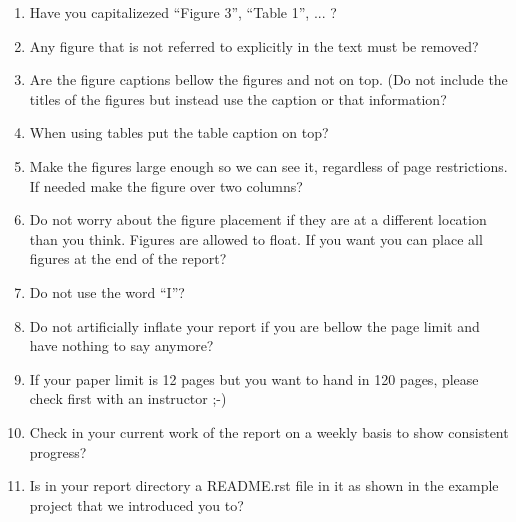 \begin{enumerate}
\item {} 
Have you capitalizezed ``Figure 3'', ``Table 1'', ... ?

\item {} 
Any figure that is not referred to explicitly in the text must be
removed?

\item {} 
Are the figure captions bellow the figures and not on top. (Do
not include the titles of the figures but instead use the caption
or that information?

\item {} 
When using tables put the table caption on top?

\item {} 
Make the figures large enough so we can see it, regardless of page
restrictions. If needed make the figure over two columns?

\item {} 
Do not worry about the figure placement if they are at a different
location than you think. Figures are allowed to float. If you want
you can place all figures at the end of the report?

\item {} 
Do not use the word ``I''?

\item {} 
Do not artificially inflate your report if you are bellow the page
limit and have nothing to say anymore?

\item {} 
If your paper limit is 12 pages but you want to hand in 120 pages,
please check first with an instructor ;-)

\item {} 
Check in your current work of the report on a weekly basis to show
consistent progress?

\item {} 
Is in your report directory a README.rst file in it as shown in the
example project that we introduced you to?

\end{enumerate}


